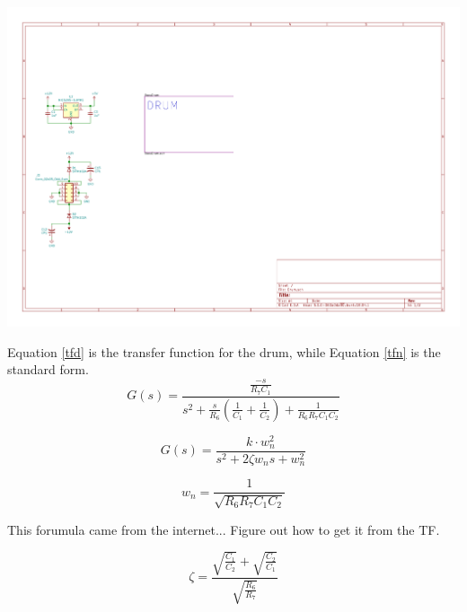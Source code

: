 \documentclass[9pt]{developercv} %
\begin{document}
\\

\begin{center}
\includegraphics[page=2,scale=0.6]{../Drum/plot/Drum.pdf}
\end{center}


Equation \ref{tfd} is the transfer function for the drum, while Equation \ref{tfn} is the standard form.
\begin{equation}
G(s) = \frac{\frac{-s}{R_7C_1}}{s^2 + \frac{s}{R_6}(\frac{1}{C_1} + \frac{1}{C_2}) + \frac{1}{R_6R_7C_1C_2}}
\label{tfd}
\end{equation}

\begin{equation}
G(s) = \frac{k\cdot w_n^2}{s^2 + 2\zeta w_n s + w_n^2}
\label{tfn}
\end{equation}

\begin{equation}
w_n = \frac{1}{\sqrt{R_6R_7C_1C_2}}
\end{equation}

This forumula came from the internet... Figure out how to get it from the TF.

\begin{equation}
\zeta = \frac{\sqrt{\frac{C_1}{C_2}} + \sqrt{\frac{C_2}{C_1}}}{\sqrt{\frac{R_6}{R_7}}}
\end{equation}
\end{document}
